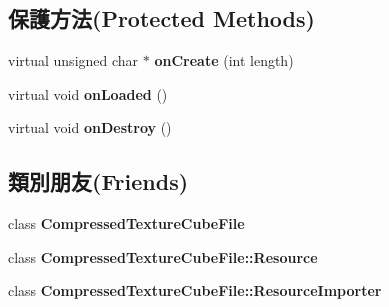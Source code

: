 \subsection*{保護方法(Protected Methods)}
\begin{DoxyCompactItemize}
\item 
virtual unsigned char $\ast$ {\bfseries on\+Create} (int length)\hypertarget{class_i_dream_sky_1_1_compressed_texture_cube_file_1_1_resource_a753cc38904725f0b2ed394bc42e1e83f}{}\label{class_i_dream_sky_1_1_compressed_texture_cube_file_1_1_resource_a753cc38904725f0b2ed394bc42e1e83f}

\item 
virtual void {\bfseries on\+Loaded} ()\hypertarget{class_i_dream_sky_1_1_compressed_texture_cube_file_1_1_resource_ad535ced0210d91b1bca646649b2111fd}{}\label{class_i_dream_sky_1_1_compressed_texture_cube_file_1_1_resource_ad535ced0210d91b1bca646649b2111fd}

\item 
virtual void {\bfseries on\+Destroy} ()\hypertarget{class_i_dream_sky_1_1_compressed_texture_cube_file_1_1_resource_a9b3498a7c00d2b8e0f03820e0fc92ad0}{}\label{class_i_dream_sky_1_1_compressed_texture_cube_file_1_1_resource_a9b3498a7c00d2b8e0f03820e0fc92ad0}

\end{DoxyCompactItemize}
\subsection*{類別朋友(Friends)}
\begin{DoxyCompactItemize}
\item 
class {\bfseries Compressed\+Texture\+Cube\+File}\hypertarget{class_i_dream_sky_1_1_compressed_texture_cube_file_1_1_resource_a63a179d595b6d0abfb05c44d067e3a8b}{}\label{class_i_dream_sky_1_1_compressed_texture_cube_file_1_1_resource_a63a179d595b6d0abfb05c44d067e3a8b}

\item 
class {\bfseries Compressed\+Texture\+Cube\+File\+::\+Resource}\hypertarget{class_i_dream_sky_1_1_compressed_texture_cube_file_1_1_resource_a7e1de0b80a712fd90724f5aefc5c547c}{}\label{class_i_dream_sky_1_1_compressed_texture_cube_file_1_1_resource_a7e1de0b80a712fd90724f5aefc5c547c}

\item 
class {\bfseries Compressed\+Texture\+Cube\+File\+::\+Resource\+Importer}\hypertarget{class_i_dream_sky_1_1_compressed_texture_cube_file_1_1_resource_ad808ef83bb3e0256cf00e349e4dbf791}{}\label{class_i_dream_sky_1_1_compressed_texture_cube_file_1_1_resource_ad808ef83bb3e0256cf00e349e4dbf791}

\end{DoxyCompactItemize}
